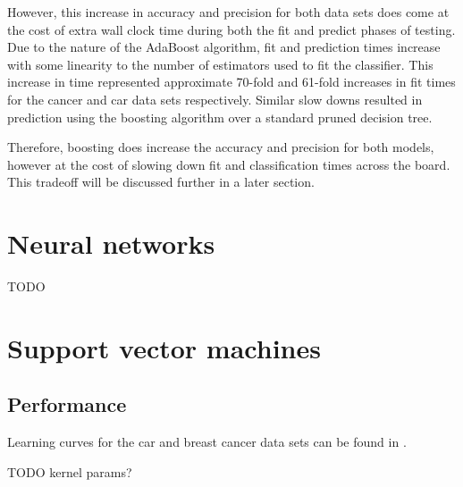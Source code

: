 \documentclass{article}
\begin{document}
    However, this increase in accuracy and precision for both data sets does come at the cost of extra wall clock time during both the fit and predict phases of testing. Due to the nature of the AdaBoost algorithm, fit and prediction times increase with some linearity to the number of estimators used to fit the classifier. This increase in time represented approximate 70-fold and 61-fold increases in fit times for the cancer and car data sets respectively. Similar slow downs resulted in prediction using the boosting algorithm over a standard pruned decision tree.

    Therefore, boosting does increase the accuracy and precision for both models, however at the cost of slowing down fit and classification times across the board. This tradeoff will be discussed further in a later section.

    \section{Neural networks}
    TODO

    \section{Support vector machines}
    

    \subsection{Performance}
    Learning curves for the car and breast cancer data sets can be found in .

    TODO kernel params?
\end{document}
